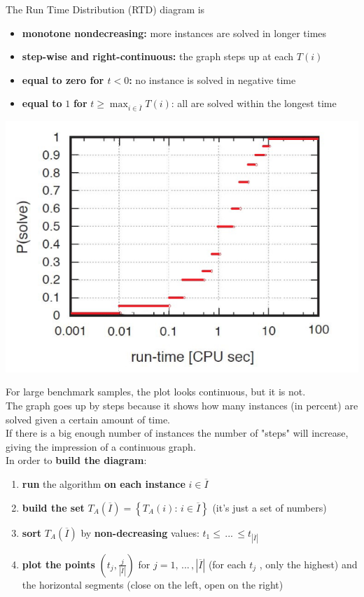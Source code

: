 The Run Time Distribution (RTD) diagram is
\begin{itemize}
	\item \textbf{monotone nondecreasing:} more instances are solved in longer times
	\item \textbf{step-wise and right-continuous:} the graph steps up at each $T (i )$
	\item \textbf{equal to zero for $t < 0$:} no instance is solved in negative time
	\item \textbf{equal to} $1$ \textbf{for} $t \geq \max_{i \in \overline{I}} T(i)$: all are solved within the longest time
\end{itemize}
\begin{center}
	\includegraphics[width=0.75\columnwidth]{img/RTD2}
\end{center}
For large benchmark samples, the plot looks continuous, but it is not.\\

The graph goes up by steps because it shows how many instances (in percent) are solved given a certain amount of time. \\
If there is a big enough number of instances the number of "steps" will increase, giving the impression of a continuous graph.\\

In order to \textbf{build the diagram}:
\begin{enumerate}
	\item \textbf{run} the algorithm \textbf{on each instance} $i \in \overline{I}$
	\item \textbf{build the set} $T_A (\overline{I}) = \left\{T_A (i): \, i \in \overline{I}\right\}$ (it's just a set of numbers)
	\item \textbf{sort} $T_A (\overline{I})$ by \textbf{non-decreasing} values: $t_1 \leq \, ... \, \leq  t_{|\overline{I}|}$
	\item \textbf{plot the points} $\left(t_j, \frac{j}{|\overline{I}|}\right)$ for $j = 1, \, ... \, , |\overline{I}|$ (for each $t_j$ , only the highest) and the horizontal segments (close on the left, open on the right)
\end{enumerate}

